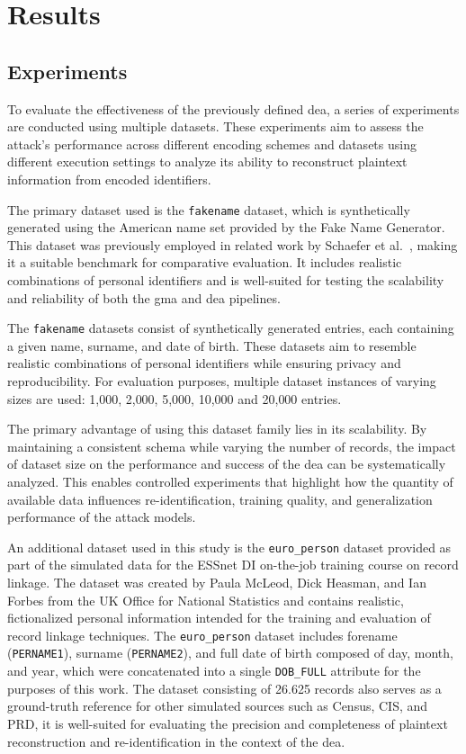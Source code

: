 \chapter{Results}  \label{sec:results}


\section{Experiments}  \label{sec:experiments}

To evaluate the effectiveness of the previously defined \ac{dea}, a series of experiments are conducted using multiple datasets.
These experiments aim to assess the attack's performance across different encoding schemes and datasets using different execution settings to analyze its ability to reconstruct plaintext information from encoded identifiers.

The primary dataset used is the \texttt{fakename} dataset, which is synthetically generated using the American name set provided by the Fake Name Generator.
This dataset was previously employed in related work by Schaefer et al.~\cite{schaefer2024}, making it a suitable benchmark for comparative evaluation.
It includes realistic combinations of personal identifiers and is well-suited for testing the scalability and reliability of both the \ac{gma} and \ac{dea} pipelines.

The \texttt{fakename} datasets consist of synthetically generated entries, each containing a given name, surname, and date of birth.
These datasets aim to resemble realistic combinations of personal identifiers while ensuring privacy and reproducibility.
For evaluation purposes, multiple dataset instances of varying sizes are used: 1{,}000, 2{,}000, 5{,}000, 10{,}000 and 20{,}000 entries.

The primary advantage of using this dataset family lies in its scalability.
By maintaining a consistent schema while varying the number of records, the impact of dataset size on the performance and success of the \ac{dea} can be systematically analyzed.
This enables controlled experiments that highlight how the quantity of available data influences re-identification, training quality, and generalization performance of the attack models.

An additional dataset used in this study is the \texttt{euro\_person} dataset provided as part of the simulated data for the ESSnet DI on-the-job training course on record linkage.
The dataset was created by Paula McLeod, Dick Heasman, and Ian Forbes from the UK Office for National Statistics and contains realistic, fictionalized personal information intended for the training and evaluation of record linkage techniques.
The \texttt{euro\_person} dataset includes forename (\texttt{PERNAME1}), surname (\texttt{PERNAME2}), and full date of birth composed of day, month, and year, which were concatenated into a single \texttt{DOB\_FULL} attribute for the purposes of this work.
The dataset consisting of 26.625 records also serves as a ground-truth reference for other simulated sources such as Census, CIS, and PRD, it is well-suited for evaluating the precision and completeness of plaintext reconstruction and re-identification in the context of the \ac{dea}.


